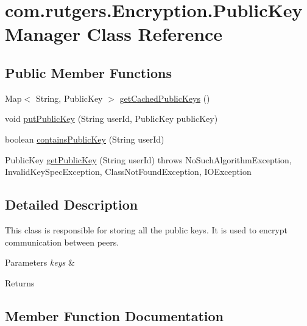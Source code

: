 \hypertarget{classcom_1_1rutgers_1_1Encryption_1_1PublicKeyManager}{}\section{com.\+rutgers.\+Encryption.\+Public\+Key\+Manager Class Reference}
\label{classcom_1_1rutgers_1_1Encryption_1_1PublicKeyManager}
\subsection*{Public Member Functions}
\begin{DoxyCompactItemize}
\item 
Map$<$ String, Public\+Key $>$ \hyperlink{classcom_1_1rutgers_1_1Encryption_1_1PublicKeyManager_a58cf8ed52b39c98025efa9801761e4c8}{get\+Cached\+Public\+Keys} ()
\item 
void \hyperlink{classcom_1_1rutgers_1_1Encryption_1_1PublicKeyManager_a601e70ef1f6f676518f2eddd8d631f1d}{put\+Public\+Key} (String user\+Id, Public\+Key public\+Key)
\item 
boolean \hyperlink{classcom_1_1rutgers_1_1Encryption_1_1PublicKeyManager_a10d45042903306981bb964e392518137}{contains\+Public\+Key} (String user\+Id)
\item 
Public\+Key \hyperlink{classcom_1_1rutgers_1_1Encryption_1_1PublicKeyManager_a729d1d0023f03f4634a8d3793c021d5b}{get\+Public\+Key} (String user\+Id)  throws No\+Such\+Algorithm\+Exception, Invalid\+Key\+Spec\+Exception, Class\+Not\+Found\+Exception, I\+O\+Exception 
\end{DoxyCompactItemize}


\subsection{Detailed Description}
This class is responsible for storing all the public keys. It is used to encrypt communication between peers. 
\begin{DoxyParams}{Parameters}
{\em keys} & \\
\hline
\end{DoxyParams}
\begin{DoxyReturn}{Returns}

\end{DoxyReturn}


\subsection{Member Function Documentation}
\mbox{\label{classcom_1_1rutgers_1_1Encryption_1_1PublicKeyManager_a10d45042903306981bb964e392518137}} 

